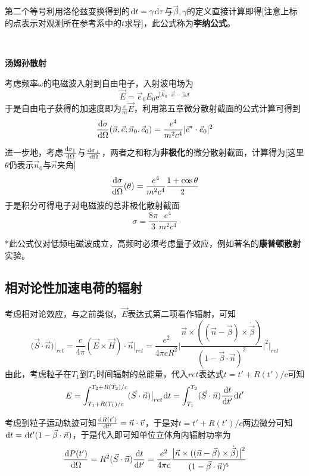 \documentclass[a4paper,UTF8,fontset=windows]{ctexart}
\newcommand*{\dr}{\hspace{0.07em}\mathrm{d}}
\newcommand*{\er}{\mathrm{e}}
\newcommand*{\ir}{\mathrm{i}}
\newcommand*{\ve}{\vec{E}}
\newcommand*{\vh}{\vec{H}}
\newcommand*{\vs}{\vec{S}}
\newcommand*{\ves}{\vec{e}}
\newcommand*{\vks}{\vec{k}}
\newcommand*{\vns}{\vec{n}}
\newcommand*{\vvs}{\vec{v}}
\newcommand*{\vx}{\vec{x}}
\newcommand*{\vbeta}{\vec{\beta}}
\newcommand*{\dt}[2][t]{\frac{\dr #2}{\dr #1}}
\begin{document}
第二个等号利用洛伦兹变换得到的$\dr t=\gamma\dr\tau$与$\vbeta,\gamma$的定义直接计算即得[注意上标的点表示对观测所在参考系中的$t$求导]，此公式称为\textbf{李纳公式}。

\

\textbf{汤姆孙散射}

考虑频率$\omega$的电磁波入射到自由电子，入射波电场为
$$\ve=\ves_0E_0\er^{\ir\vks_0\cdot\vx-\ir\omega t}$$
于是自由电子获得的加速度即为$\frac{e}{m}\ve$，利用第五章微分散射截面的公式计算可得到
$$\frac{\dr\sigma}{\dr\Omega}(\vns,\ves;\vns_0,\ves_0)=\frac{e^4}{m^2c^4}|\ves^*\cdot\ves_0|^2$$

进一步地，考虑$\dt[\Omega]{\sigma_\parallel}$与$\dt[\Omega]{\sigma_\bot}$，两者之和称为\textbf{非极化}的微分散射截面，计算得为[这里$\theta$仍表示$\vns_0$与$\vns$夹角]
$$\frac{\dr\sigma}{\dr\Omega}(\theta)=\frac{e^4}{m^2c^4}\frac{1+\cos\theta}{2}$$
于是积分可得电子对电磁波的总非极化散射截面
$$\sigma=\frac{8\pi}{3}\frac{e^4}{m^2c^4}$$

*此公式仅对低频电磁波成立，高频时必须考虑量子效应，例如著名的\textbf{康普顿散射}实验。

\subsection{相对论性加速电荷的辐射}
考虑相对论效应，与之前类似，$\ve$表达式第二项看作辐射，可知
$$\big(\vs\cdot\vns\big)\big|_{ret}=\frac{c}{4\pi}(\ve\times\vh)\cdot\vns\bigg|_{ret}=\frac{e^2}{4\pi cR^2}\bigg|\frac{\vns\times((\vns-\vbeta)\times\dot{\vbeta})}{(1-\vbeta\cdot\vns)^3}\bigg|^2\bigg|_{ret}$$
由此，考虑粒子在$T_1$到$T_2$时间辐射的总能量，代入$ret$表达式$t=t'+R(t')/c$可知
$$E=\int_{T_1+R(T_1)/c}^{T_2+R(T_2)/c}(\vs\cdot\vns)\big|_{ret}\dr t=\int_{T_1}^{T_2}(\vs\cdot\vns)\frac{\dr t}{\dr t'}\dr t'$$

考虑到粒子运动轨迹可知$\dt[t']{R(t')}=\vns\cdot\vvs$，于是对$t=t'+R(t')/c$两边微分可知$\dr t=\dr t'(1-\vbeta\cdot\vns)$，于是代入即可知单位立体角内辐射功率为
$$\dt[\Omega]{P(t')}=R^2(\vs\cdot\vns)\frac{\dr t}{\dr t'}=\frac{e^2}{4\pi c}\frac{\big|\vns\times((\vns-\vbeta)\times\dot{\vbeta})\big|^2}{(1-\vbeta\cdot\vns)^5}$$

\
\end{document}
